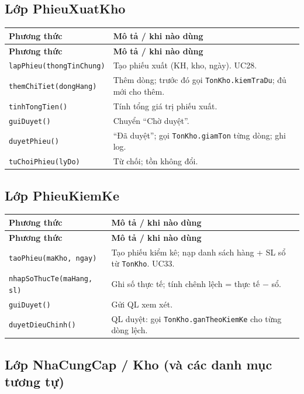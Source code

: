 \subsection{Lớp PhieuXuatKho}

\begin{longtable}{|p{4.2cm}|p{8.5cm}|}
\hline
\textbf{Phương thức} & \textbf{Mô tả / khi nào dùng} \\
\hline
\endfirsthead
\hline
\textbf{Phương thức} & \textbf{Mô tả / khi nào dùng} \\
\hline
\endhead
\texttt{lapPhieu(thongTinChung)} & Tạo phiếu xuất (KH, kho, ngày). UC28. \\
\hline
\texttt{themChiTiet(dongHang)} & Thêm dòng; trước đó gọi \texttt{TonKho.kiemTraDu}; đủ mới cho thêm. \\
\hline
\texttt{tinhTongTien()} & Tính tổng giá trị phiếu xuất. \\
\hline
\texttt{guiDuyet()} & Chuyển ``Chờ duyệt''. \\
\hline
\texttt{duyetPhieu()} & ``Đã duyệt''; gọi \texttt{TonKho.giamTon} từng dòng; ghi log. \\
\hline
\texttt{tuChoiPhieu(lyDo)} & Từ chối; tồn không đổi. \\
\hline
\end{longtable}

\subsection{Lớp PhieuKiemKe}

\begin{longtable}{|p{4.5cm}|p{8.2cm}|}
\hline
\textbf{Phương thức} & \textbf{Mô tả / khi nào dùng} \\
\hline
\endfirsthead
\hline
\textbf{Phương thức} & \textbf{Mô tả / khi nào dùng} \\
\hline
\endhead
\texttt{taoPhieu(maKho, ngay)} & Tạo phiếu kiểm kê; nạp danh sách hàng + SL sổ từ \texttt{TonKho}. UC33. \\
\hline
\texttt{nhapSoThucTe(maHang, sl)} & Ghi số thực tế; tính chênh lệch = thực tế $-$ sổ. \\
\hline
\texttt{guiDuyet()} & Gửi QL xem xét. \\
\hline
\texttt{duyetDieuChinh()} & QL duyệt: gọi \texttt{TonKho.ganTheoKiemKe} cho từng dòng lệch. \\
\hline
\end{longtable}

\subsection{Lớp NhaCungCap / Kho (và các danh mục tương tự)}

